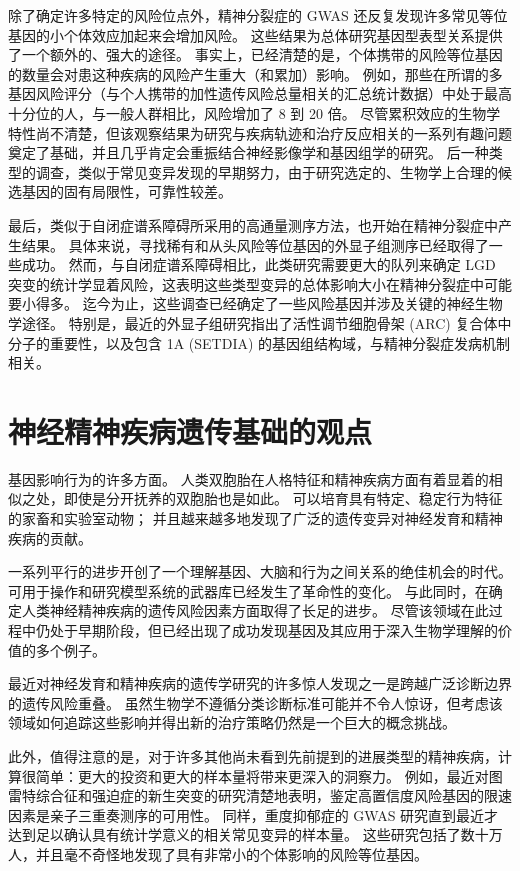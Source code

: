 除了确定许多特定的风险位点外，精神分裂症的 GWAS 还反复发现许多常见等位基因的小个体效应加起来会增加风险。 
这些结果为总体研究基因型表型关系提供了一个额外的、强大的途径。 
事实上，已经清楚的是，个体携带的风险等位基因的数量会对患这种疾病的风险产生重大（和累加）影响。 
例如，那些在所谓的多基因风险评分（与个人携带的加性遗传风险总量相关的汇总统计数据）中处于最高十分位的人，与一般人群相比，风险增加了 8 到 20 倍。 
尽管累积效应的生物学特性尚不清楚，但该观察结果为研究与疾病轨迹和治疗反应相关的一系列有趣问题奠定了基础，并且几乎肯定会重振结合神经影像学和基因组学的研究。 
后一种类型的调查，类似于常见变异发现的早期努力，由于研究选定的、生物学上合理的候选基因的固有局限性，可靠性较差。


最后，类似于自闭症谱系障碍所采用的高通量测序方法，也开始在精神分裂症中产生结果。 
具体来说，寻找稀有和从头风险等位基因的外显子组测序已经取得了一些成功。 
然而，与自闭症谱系障碍相比，此类研究需要更大的队列来确定 LGD 突变的统计学显着风险，这表明这些类型变异的总体影响大小在精神分裂症中可能要小得多。 
迄今为止，这些调查已经确定了一些风险基因并涉及关键的神经生物学途径。 
特别是，最近的外显子组研究指出了活性调节细胞骨架 (ARC) 复合体中分子的重要性，以及包含 1A (SETDIA) 的基因组结构域，与精神分裂症发病机制相关。


\section{神经精神疾病遗传基础的观点}

基因影响行为的许多方面。 
人类双胞胎在人格特征和精神疾病方面有着显着的相似之处，即使是分开抚养的双胞胎也是如此。 
可以培育具有特定、稳定行为特征的家畜和实验室动物； 
并且越来越多地发现了广泛的遗传变异对神经发育和精神疾病的贡献。


一系列平行的进步开创了一个理解基因、大脑和行为之间关系的绝佳机会的时代。 
可用于操作和研究模型系统的武器库已经发生了革命性的变化。 
与此同时，在确定人类神经精神疾病的遗传风险因素方面取得了长足的进步。 
尽管该领域在此过程中仍处于早期阶段，但已经出现了成功发现基因及其应用于深入生物学理解的价值的多个例子。


最近对神经发育和精神疾病的遗传学研究的许多惊人发现之一是跨越广泛诊断边界的遗传风险重叠。 
虽然生物学不遵循分类诊断标准可能并不令人惊讶，但考虑该领域如何追踪这些影响并得出新的治疗策略仍然是一个巨大的概念挑战。


此外，值得注意的是，对于许多其他尚未看到先前提到的进展类型的精神疾病，计算很简单：更大的投资和更大的样本量将带来更深入的洞察力。 
例如，最近对图雷特综合征和强迫症的新生突变的研究清楚地表明，鉴定高置信度风险基因的限速因素是亲子三重奏测序的可用性。 
同样，重度抑郁症的 GWAS 研究直到最近才达到足以确认具有统计学意义的相关常见变异的样本量。 
这些研究包括了数十万人，并且毫不奇怪地发现了具有非常小的个体影响的风险等位基因。


